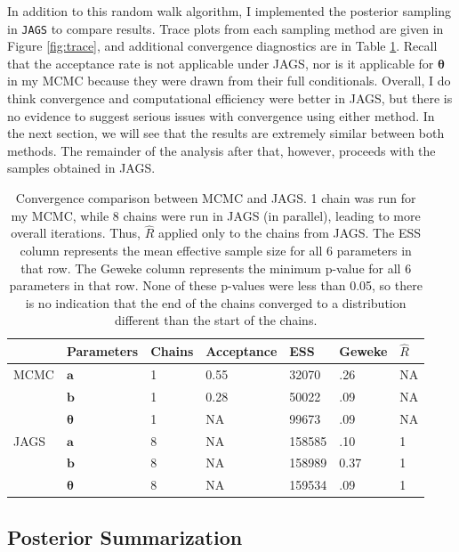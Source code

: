 \documentclass{article}
\begin{document}
In addition to this random walk algorithm, I implemented the posterior sampling in \texttt{JAGS} to compare results. Trace plots from each sampling method are given in Figure \ref{fig:trace}, and additional convergence diagnostics are in Table \ref{tab:conv}. Recall that the acceptance rate is not applicable under JAGS, nor is it applicable for $\boldsymbol{\theta}$ in my MCMC because they were drawn from their full conditionals. Overall, I do think convergence and computational efficiency were better in JAGS, but there is no evidence to suggest serious issues with convergence using either method. In the next section, we will see that the results are extremely similar between both methods. The remainder of the analysis after that, however, proceeds with the samples obtained in JAGS.

\begin{table}[]
    \centering
    \begin{tabular}{lllllll}
    \toprule[1.5pt]
         & Parameters & Chains & Acceptance & ESS & Geweke & $\hat{R}$ \\
         \midrule
        MCMC & $\boldsymbol{a}$ & 1 & 0.55 & 32070 & .26 & NA \\
        & $\boldsymbol{b}$ & 1 & 0.28 & 50022 & .09 & NA \\
        & $\boldsymbol{\theta}$ & 1 & NA & 99673 & .09 & NA \\
        JAGS & $\boldsymbol{a}$ & 8 & NA & 158585 & .10 & 1 \\
        & $\boldsymbol{b}$ & 8 & NA & 158989 & 0.37 & 1 \\
        & $\boldsymbol{\theta}$ & 8 & NA & 159534 & .09 & 1 \\
        \bottomrule[1.5pt]
    \end{tabular}
    \caption{Convergence comparison between MCMC and JAGS.  1 chain was run for my MCMC, while 8 chains were run in JAGS (in parallel), leading to more overall iterations. Thus, $\hat{R}$ applied only to the chains from JAGS. The ESS column represents the mean effective sample size for all 6 parameters in that row. The Geweke column represents the minimum p-value for all 6 parameters in that row. None of these p-values were less than 0.05, so there is no indication that the end of the chains converged to a distribution different than the start of the chains.}
    \label{tab:conv}
\end{table}

\subsection{Posterior Summarization}
\end{document}
